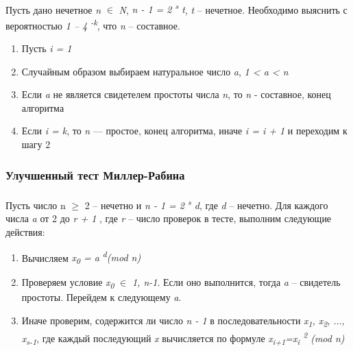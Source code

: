 \paragraph{}Пусть дано нечетное \textit{n} {$\in$} \textit{N}, \textit{n - 1 = 2\textsuperscript{ s} t}, \textit{t} – нечетное. Необходимо выяснить 
с вероятностью \textit{1 – 4\textsuperscript{ -k}}, что \textit{n} – составное.
  
  \begin{enumerate}
   \item Пусть \textit{i = 1}
   \item Случайным образом выбираем натуральное число \textit{a}, \textit{1 < a < n}
   \item Если \textit{a} не является свидетелем простоты числа \textit{n}, то \textit{n} - составное, конец алгоритма
   \item Если \textit{i = k}, то \textit{n} — простое, конец алгоритма, иначе \textit{i = i + 1} и переходим к шагу 2
  \end{enumerate}

\subsubsection{Улучшенный тест Миллер-Рабина}

\paragraph{} Пусть число n {$\ge$} 2 – нечетно и \textit{n - 1 = 2\textsuperscript{ s} d}, где \textit{d} – нечетно. Для каждого числа \textit{a}
от 2 до \textit{r + 1} , где \textit{r} – число проверок в  тесте, выполним следующие действия:

  \begin{enumerate}
   \item Вычисляем \textit{x\textsubscript{0} = a\textsuperscript{ d}(mod n)}
   \item Проверяем условие \textit{x\textsubscript{0}} {$\in$} \textit{{1, n-1}}. Если оно выполнится, тогда \textit{a} – свидетель 
простоты. Перейдем к следующему \textit{a}.
   \item Иначе проверим, содержится ли число \textit{n - 1} в последовательности 
\textit{{x\textsubscript{1}, x\textsubscript{2}, {$\dots$}, x\textsubscript{s-1}}}, где каждый последующий \textit{x} 
вычисляется по формуле \textit{x\textsubscript{i+1}=x\textsubscript{i}\textsuperscript{ 2} (mod n)}
  \end{enumerate}
  
